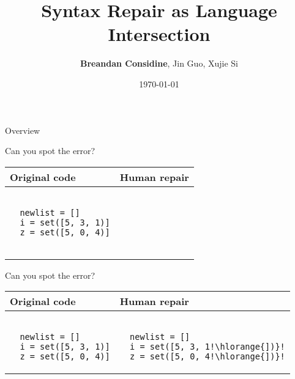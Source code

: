 \documentclass{beamer}
\title[Syntax Repair as Language Intersection]{Syntax Repair as Language Intersection}
\author[Considine, Guo, Si]{\textbf{Breandan Considine}, Jin Guo, Xujie Si}
\institute[McGill]{
  McGill University, Mila IQIA\\
  \medskip
  \textit{bre@ndan.co}
}
\date{\today}
\begin{document}
\begin{frame}
  \titlepage
\end{frame}

\begin{frame}{Overview}
  \tableofcontents
\end{frame}

\begin{frame}[fragile]{Can you spot the error?}
  \begin{center}
    \begin{tabular}{|m{5.5cm}|m{5.5cm}|}
      \hline \rule{0pt}{2.5ex}\textbf{Original code}\rule[-1ex]{0pt}{2ex} &  \rule{0pt}{2.5ex}\textbf{Human repair}\rule[-1ex]{0pt}{2ex} \\\hline
      \begin{lstlisting}[escapechar=!, basicstyle=\linespread{1.3}\ttfamily\footnotesize]

  newlist = []
  i = set([5, 3, 1)]
  z = set([5, 0, 4)]


      \end{lstlisting} & \begin{lstlisting}[escapechar=!, basicstyle=\linespread{1.3}\ttfamily\footnotesize]

      \end{lstlisting} \\\hline
    \end{tabular}
  \end{center}
\end{frame}

\begin{frame}[fragile]{Can you spot the error?}
  \begin{center}
    \begin{tabular}{|m{5.5cm}|m{5.5cm}|}
      \hline \rule{0pt}{2.5ex}\textbf{Original code}\rule[-1ex]{0pt}{2ex} &  \rule{0pt}{2.5ex}\textbf{Human repair}\rule[-1ex]{0pt}{2ex} \\\hline
      \begin{lstlisting}[escapechar=!, basicstyle=\linespread{1.3}\ttfamily\footnotesize]

  newlist = []
  i = set([5, 3, 1)]
  z = set([5, 0, 4)]

      \end{lstlisting} & \begin{lstlisting}[escapechar=!, basicstyle=\linespread{1.3}\ttfamily\footnotesize]

  newlist = []
  i = set([5, 3, 1!\hlorange{])}!
  z = set([5, 0, 4!\hlorange{])}!

      \end{lstlisting} \\\hline
    \end{tabular}
  \end{center}
\end{frame}
\end{document}
